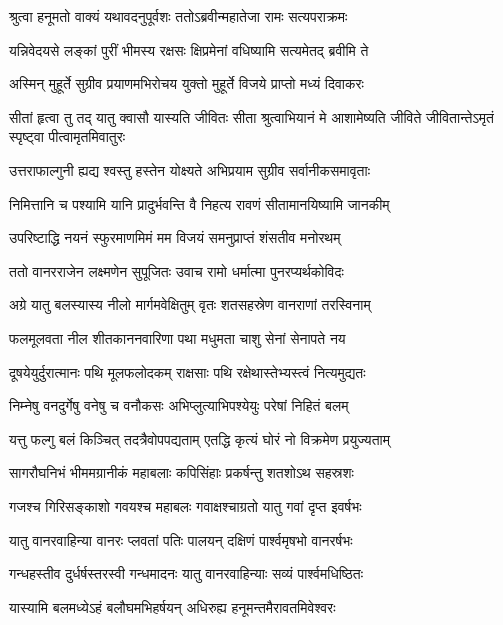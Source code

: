 
\twolineshloka
{श्रुत्वा हनूमतो वाक्यं यथावदनुपूर्वशः}
{ततोऽब्रवीन्महातेजा रामः सत्यपराक्रमः} %

\twolineshloka
{यन्निवेदयसे लङ्कां पुरीं भीमस्य रक्षसः}
{क्षिप्रमेनां वधिष्यामि सत्यमेतद् ब्रवीमि ते} %

\twolineshloka
{अस्मिन् मुहूर्ते सुग्रीव प्रयाणमभिरोचय}
{युक्तो मुहूर्ते विजये प्राप्तो मध्यं दिवाकरः} %

\threelineshloka
{सीतां हृत्वा तु तद् यातु क्वासौ यास्यति जीवितः}
{सीता श्रुत्वाभियानं मे आशामेष्यति जीविते}
{जीवितान्तेऽमृतं स्पृष्ट्वा पीत्वामृतमिवातुरः} %

\twolineshloka
{उत्तराफाल्गुनी ह्यद्य श्वस्तु हस्तेन योक्ष्यते}
{अभिप्रयाम सुग्रीव सर्वानीकसमावृताः} %

\twolineshloka
{निमित्तानि च पश्यामि यानि प्रादुर्भवन्ति वै}
{निहत्य रावणं सीतामानयिष्यामि जानकीम्} %

\twolineshloka
{उपरिष्टाद्धि नयनं स्फुरमाणमिमं मम}
{विजयं समनुप्राप्तं शंसतीव मनोरथम्} %

\twolineshloka
{ततो वानरराजेन लक्ष्मणेन सुपूजितः}
{उवाच रामो धर्मात्मा पुनरप्यर्थकोविदः} %

\twolineshloka
{अग्रे यातु बलस्यास्य नीलो मार्गमवेक्षितुम्}
{वृतः शतसहस्रेण वानराणां तरस्विनाम्} %

\twolineshloka
{फलमूलवता नील शीतकाननवारिणा}
{पथा मधुमता चाशु सेनां सेनापते नय} %

\twolineshloka
{दूषयेयुर्दुरात्मानः पथि मूलफलोदकम्}
{राक्षसाः पथि रक्षेथास्तेभ्यस्त्वं नित्यमुद्यतः} %

\twolineshloka
{निम्नेषु वनदुर्गेषु वनेषु च वनौकसः}
{अभिप्लुत्याभिपश्येयुः परेषां निहितं बलम्} %

\twolineshloka
{यत्तु फल्गु बलं किञ्चित् तदत्रैवोपपद्यताम्}
{एतद्धि कृत्यं घोरं नो विक्रमेण प्रयुज्यताम्} %

\twolineshloka
{सागरौघनिभं भीममग्रानीकं महाबलाः}
{कपिसिंहाः प्रकर्षन्तु शतशोऽथ सहस्रशः} %

\twolineshloka
{गजश्च गिरिसङ्काशो गवयश्च महाबलः}
{गवाक्षश्चाग्रतो यातु गवां दृप्त इवर्षभः} %

\twolineshloka
{यातु वानरवाहिन्या वानरः प्लवतां पतिः}
{पालयन् दक्षिणं पार्श्वमृषभो वानरर्षभः} %

\twolineshloka
{गन्धहस्तीव दुर्धर्षस्तरस्वी गन्धमादनः}
{यातु वानरवाहिन्याः सव्यं पार्श्वमधिष्ठितः} %

\twolineshloka
{यास्यामि बलमध्येऽहं बलौघमभिहर्षयन्}
{अधिरुह्य हनूमन्तमैरावतमिवेश्वरः} %

